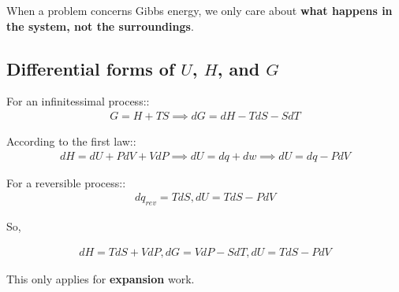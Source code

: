 \documentclass[12pt]{book}
\begin{document}
When a problem concerns Gibbs energy, we only care about \textbf{what happens in the system, not the surroundings}.

\subsection*{Differential forms of $U$, $H$, and $G$}
For an infinitessimal process::
\begin{align*}
    G=H+TS\implies dG=dH-TdS-SdT
\end{align*}

According to the first law::
\begin{align*}
    dH=dU+PdV+VdP\implies dU=dq+dw\implies dU=dq-PdV
\end{align*}

For a reversible process::
\begin{align*}
    dq_{rev}=TdS, dU=TdS-PdV
\end{align*}

So,

\begin{align*}
    dH=TdS+VdP,dG=VdP-SdT, dU=TdS-PdV
\end{align*}

This only applies for \textbf{expansion} work.
\end{document}
